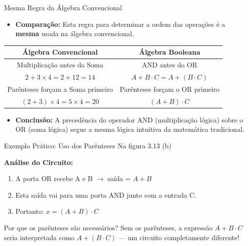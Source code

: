 \begin{frame}{Mesma Regra da Álgebra Convencional}
    \begin{itemize}
        \item \textbf{Comparação:} Esta regra para determinar a ordem das operações é a \textbf{mesma} usada na álgebra convencional.
    \end{itemize}
    \vspace{0.3cm}
    \begin{table}
        \centering
        \begin{tabular}{c|c}
            \hline
            \textbf{Álgebra Convencional}        & \textbf{Álgebra Booleana}         \\ \hline
            Multiplicação antes da Soma          & AND antes do OR                   \\
            $2 + 3 \times 4 = 2 + 12 = 14$       & $A + B \cdot C = A + (B \cdot C)$ \\
            Parênteses forçam a Soma primeiro    & Parênteses forçam o OR primeiro   \\
            $(2 + 3) \times 4 = 5 \times 4 = 20$ & $(A + B) \cdot C$                 \\ \hline
        \end{tabular}
    \end{table}
    \vspace{0.3cm}
    \begin{itemize}
        \item \textbf{Conclusão:} A precedência do operador AND (multiplicação lógica) sobre o OR (soma lógica) segue a mesma lógica intuitiva da matemática tradicional.
    \end{itemize}
\end{frame}

\begin{frame}{Exemplo Prático: Uso dos Parênteses}
    Na figura 3.13 (b)

    \vspace{0.2cm}
    \textbf{Análise do Circuito:}
    \begin{enumerate}
        \item A porta OR recebe A e B $\rightarrow$ saída = $A + B$
        \item Esta saída vai para uma porta AND junto com a entrada C.
        \item Portanto: $x = (A + B) \cdot C$
    \end{enumerate}

    \begin{block}{Por que os parênteses são necessários?}
        Sem os parênteses, a expressão $A + B \cdot C$ seria interpretada como $A + (B \cdot C)$ --- um circuito completamente diferente!
    \end{block}
\end{frame}

